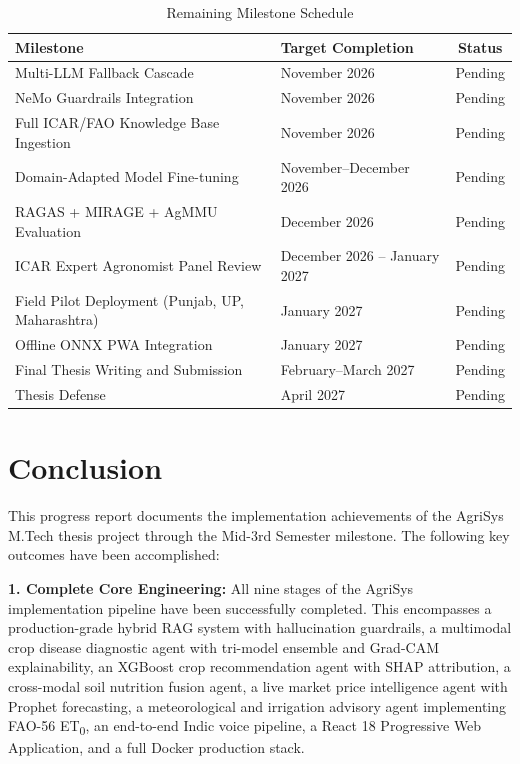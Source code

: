 \documentclass[12pt,a4paper]{article}
\begin{document}
\begin{table}[htbp]
\centering
\small
\setlength{\tabcolsep}{4pt}
\renewcommand{\arraystretch}{1.05}
\caption{Remaining Milestone Schedule}
\label{tab:roadmap}
\begin{tabularx}{\textwidth}{|>{\raggedright\arraybackslash}X|>{\raggedright\arraybackslash}p{4.2cm}|c|}
\hline
\textbf{Milestone} & \textbf{Target Completion} & \textbf{Status} \\
\hline
Multi-LLM Fallback Cascade & November 2026 & Pending \\
\hline
NeMo Guardrails Integration & November 2026 & Pending \\
\hline
Full ICAR/FAO Knowledge Base Ingestion & November 2026 & Pending \\
\hline
Domain-Adapted Model Fine-tuning & November--December 2026 & Pending \\
\hline
RAGAS + MIRAGE + AgMMU Evaluation & December 2026 & Pending \\
\hline
ICAR Expert Agronomist Panel Review & December 2026 -- January 2027 & Pending \\
\hline
Field Pilot Deployment (Punjab, UP, Maharashtra) & January 2027 & Pending \\
\hline
Offline ONNX PWA Integration & January 2027 & Pending \\
\hline
Final Thesis Writing and Submission & February--March 2027 & Pending \\
\hline
Thesis Defense & April 2027 & Pending \\
\hline
\end{tabularx}
\end{table}

\clearpage
\section{Conclusion}

This progress report documents the implementation achievements of the AgriSys M.Tech thesis project through the Mid-3rd Semester milestone. The following key outcomes have been accomplished:

\textbf{1. Complete Core Engineering:} All nine stages of the AgriSys implementation pipeline have been successfully completed. This encompasses a production-grade hybrid RAG system with hallucination guardrails, a multimodal crop disease diagnostic agent with tri-model ensemble and Grad-CAM explainability, an XGBoost crop recommendation agent with SHAP attribution, a cross-modal soil nutrition fusion agent, a live market price intelligence agent with Prophet forecasting, a meteorological and irrigation advisory agent implementing FAO-56 ET\textsubscript{0}, an end-to-end Indic voice pipeline, a React 18 Progressive Web Application, and a full Docker production stack.
\end{document}
